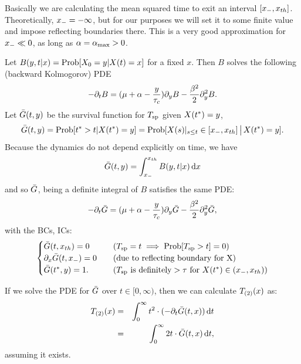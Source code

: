 \documentclass[12pt]{iopart}
\begin{document}
Basically we are calculating the mean squared time to exit an interval
$[{ x_{-} }, { x_{th} }]$. Theoretically, ${ x_{-} } = -\infty$, but for our purposes we will set it to
some finite value and impose reflecting boundaries there. This is a very
good approximation for ${ x_{-} } \ll 0$, as long as ${\alpha} = { {\alpha}_{\textrm{max}} } >0$.

Let $B(y,t|x) = \operatorname{Prob}[X_0 = y| X(t) = x]$ for a fixed $x$. Then $B$ solves the
following (backward Kolmogorov) PDE
\begin{equation}
-{\partial}_t B = ({\mu } + {\alpha} - \frac y{{ \tau_{c} }}){\partial}_yB - \frac {{\beta}^2} 2 {\partial}_y^2 B.
\label{eq:backward_Xdensity}
\end{equation}
Let ${ \bar{G} }(t,y)$ be the survival function for ${ T_{\textrm{sp} } }$ given $X({ t^* }) = y$,
$${ \bar{G} }(t,y) = \operatorname{Prob}[{ t^* }>t | X({ t^* }) = y] = \operatorname{Prob}[X(s)|_{s \leq t} \in [{ x_{-} },
{ x_{th} }] \,\big|\, X({ t^* }) = y].$$
Because the dynamics do not depend explicitly on time, we have
$$
{ \bar{G} }(t,y) = \int_{ x_{-} }^{ x_{th} } B(y,t|x) \, \mathrm{d} x
$$
and so ${ \bar{G} }$, being a definite integral of $B$ satisfies the same PDE:
\begin{equation}
-{\partial}_t { \bar{G} } = ({\mu } + {\alpha} - \frac y{{ \tau_{c} }}) {\partial}_y{ \bar{G} } - \frac {{\beta}^2} 2 {\partial}_y^2 { \bar{G} },
\label{eq:backward_SDF}
\end{equation}
with the BCs, ICs:
\begin{equation}
\begin{cases}
{ \bar{G} }(t,{ x_{th} }) = 0 & \quad ({ T_{\textrm{sp} } } = t \implies \operatorname{Prob}[{ T_{\textrm{sp} } }>t] = 0)
\\
{\partial}_x { \bar{G} }(t,{ x_{-} }) = 0  & \quad (\textrm{due to reflecting boundary for X})
\\
{ \bar{G} }({ t^* }, y) = 1. & \quad ({ T_{\textrm{sp} } } \textrm{ is definitely} > {\tau} \textrm{ for } X({ t^* })
\in ({ x_{-} }, { x_{th} }) )
\end{cases}
\end{equation}

If we solve the PDE for ${ \bar{G} }$ over $t \in [0,\infty)$, then we can calculate
${ {T}_{(2)} }(x)$ as:
\begin{eqnarray}
{ {T}_{(2)} }(x) &=& \int_0^\infty t^2 \cdot (-{\partial}_t{ \bar{G} }(t,x)) \, \mathrm{d} t
\\
		   &=& \int_0^\infty 2t \cdot { \bar{G} }(t,x) \, \mathrm{d} t,
\end{eqnarray}
assuming it exists.
\end{document}
